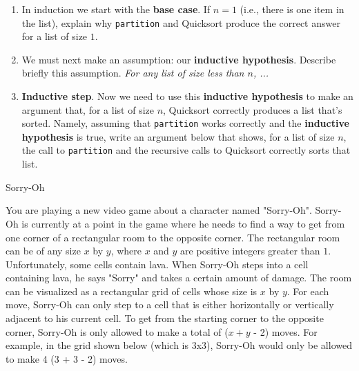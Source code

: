 \documentclass[10pt]{article}
\begin{document}
\begin{enumerate}
    \item In induction we start with the \textbf{base case}.  If $n=1$ (i.e., there is one item in the list), explain why \texttt{partition} and Quicksort produce the correct answer for a list of size $1$.

    \solution{ 
    }
    
    \item We must next make an assumption: our \textbf{inductive hypothesis}.  Describe briefly this assumption.  \textit{For any list of size less than $n$, ...}
        
    \solution{ 
    }
        
    \item \textbf{Inductive step}.  Now we need to use this \textbf{inductive hypothesis} to make an argument that, for a list of size $n$, Quicksort correctly produces a list that's sorted.  Namely, assuming that \texttt{partition} works correctly and the \textbf{inductive hypothesis} is true, write an argument below that shows, for a list of size $n$, the call to \texttt{partition} and the recursive calls to Quicksort correctly sorts that list.
    
    \solution{
    }
        
\end{enumerate}

\begin{problem} Sorry-Oh \end{problem}

You are playing a new video game about a character named "Sorry-Oh". Sorry-Oh is currently at a point in the game where he needs to find a way to get from one corner of a rectangular room to the opposite corner. The rectangular room can be of any size $x$ by $y$, where $x$ and $y$ are positive integers greater than $1$. Unfortunately, some cells contain lava. When Sorry-Oh steps into a cell containing lava, he says "Sorry" and takes a certain amount of damage. The room can be visualized as a rectangular grid of cells whose size is $x$ by $y$. For each move, Sorry-Oh can only step to a cell that is either horizontally or vertically adjacent to his current cell. To get from the starting corner to the opposite corner, Sorry-Oh is only allowed to make a total of ($x + y$ - 2) moves. For example, in the grid shown below (which is 3x3), Sorry-Oh would only be allowed to make 4 (3 + 3 - 2) moves.   
\end{document}
